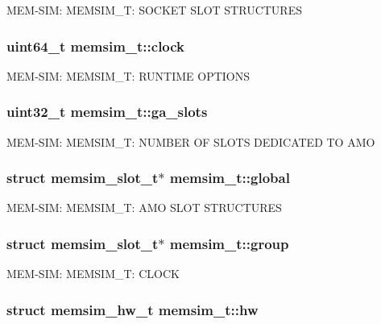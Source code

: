 M\-E\-M-\/\-S\-I\-M\-: M\-E\-M\-S\-I\-M\-\_\-\-T\-: S\-O\-C\-K\-E\-T S\-L\-O\-T S\-T\-R\-U\-C\-T\-U\-R\-E\-S \hypertarget{structmemsim__t_a09a7513daf69ea79d15c89b11efe5431}{
\subsubsection[{clock}]{\setlength{\rightskip}{0pt plus 5cm}uint64\-\_\-t memsim\-\_\-t\-::clock}}\label{structmemsim__t_a09a7513daf69ea79d15c89b11efe5431}
M\-E\-M-\/\-S\-I\-M\-: M\-E\-M\-S\-I\-M\-\_\-\-T\-: R\-U\-N\-T\-I\-M\-E O\-P\-T\-I\-O\-N\-S \hypertarget{structmemsim__t_af10e3ad73189bf418d29478bb4de5eb2}{
\subsubsection[{ga\-\_\-slots}]{\setlength{\rightskip}{0pt plus 5cm}uint32\-\_\-t memsim\-\_\-t\-::ga\-\_\-slots}}\label{structmemsim__t_af10e3ad73189bf418d29478bb4de5eb2}
M\-E\-M-\/\-S\-I\-M\-: M\-E\-M\-S\-I\-M\-\_\-\-T\-: N\-U\-M\-B\-E\-R O\-F S\-L\-O\-T\-S D\-E\-D\-I\-C\-A\-T\-E\-D T\-O A\-M\-O \hypertarget{structmemsim__t_a3b005d5aa8e759a08281f59c9f05ed3b}{
\subsubsection[{global}]{\setlength{\rightskip}{0pt plus 5cm}struct {\bf memsim\-\_\-slot\-\_\-t}$\ast$ memsim\-\_\-t\-::global}}\label{structmemsim__t_a3b005d5aa8e759a08281f59c9f05ed3b}
M\-E\-M-\/\-S\-I\-M\-: M\-E\-M\-S\-I\-M\-\_\-\-T\-: A\-M\-O S\-L\-O\-T S\-T\-R\-U\-C\-T\-U\-R\-E\-S \hypertarget{structmemsim__t_a0569d3661744c965a6620ca75563144d}{
\subsubsection[{group}]{\setlength{\rightskip}{0pt plus 5cm}struct {\bf memsim\-\_\-slot\-\_\-t}$\ast$ memsim\-\_\-t\-::group}}\label{structmemsim__t_a0569d3661744c965a6620ca75563144d}
M\-E\-M-\/\-S\-I\-M\-: M\-E\-M\-S\-I\-M\-\_\-\-T\-: C\-L\-O\-C\-K \hypertarget{structmemsim__t_af5113def268ae634e203d4a6639a37f3}{
\subsubsection[{hw}]{\setlength{\rightskip}{0pt plus 5cm}struct {\bf memsim\-\_\-hw\-\_\-t} memsim\-\_\-t\-::hw}}\label{structmemsim__t_af5113def268ae634e203d4a6639a37f3}
